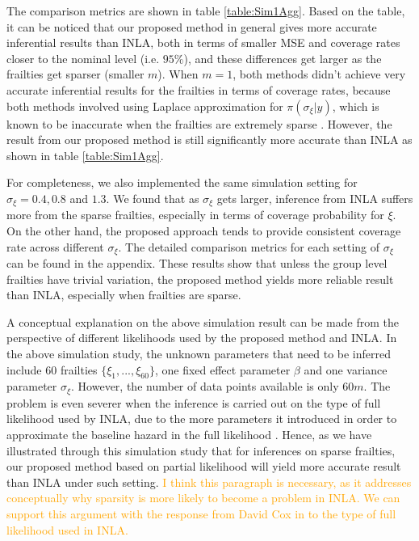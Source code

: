 \documentclass[ba]{imsart}
\newcommand{\ziang}[1]{\textcolor{orange}{{ }#1}}
\begin{document}
The comparison metrics are shown in table \ref{table:Sim1Agg}. Based on the table, it can be noticed that our proposed method in general gives more accurate inferential results than INLA, both in terms of smaller MSE and coverage rates closer to the nominal level (i.e. $95\%$), and these differences get larger as the frailties get sparser (smaller $m$). When $m = 1$, both methods didn't achieve very accurate inferential results for the frailties in terms of coverage rates, because both methods involved using Laplace approximation for $\pi(\sigma_\xi|y)$, which is known to be inaccurate when the frailties are extremely sparse \citep{Ogden2013ASR}. However, the result from our proposed method is still significantly more accurate than INLA as shown in table \ref{table:Sim1Agg}.

For completeness, we also implemented the same simulation setting for $\sigma_\xi = 0.4, 0.8$ and $1.3$. We found that as $\sigma_\xi$ gets larger, inference from INLA suffers more from the sparse frailties, especially in terms of coverage probability for $\xi$. On the other hand, the proposed approach tends to provide consistent coverage rate across different $\sigma_\xi$. The detailed comparison metrics for each setting of $\sigma_\xi$ can be found in the appendix. These results show that unless the group level frailties have trivial variation, the proposed method yields more reliable result than INLA, especially when frailties are sparse.


A conceptual explanation on the above simulation result can be made from the perspective of different likelihoods used by the proposed method and INLA. In the above simulation study, the unknown parameters that need to be inferred include 60 frailties $\{\xi_1,...,\xi_{60}\}$, one fixed effect parameter $\beta$ and one variance parameter $\sigma_\xi$. However, the number of data points available is only $60m$. The problem is even severer when the inference is carried out on the type of full likelihood used by INLA, due to the more parameters it introduced in order to approximate the baseline hazard in the full likelihood \citep{coxdiscussion}. Hence, as we have illustrated through this simulation study that for inferences on sparse frailties, our proposed method based on partial likelihood will yield more accurate result than INLA under such setting.
\ziang{I think this paragraph is necessary, as it addresses conceptually why sparsity is more likely to become a problem in INLA. We can support this argument with the response from David Cox in \cite{coxdiscussion} to the type of full likelihood used in INLA. }
\end{document}
